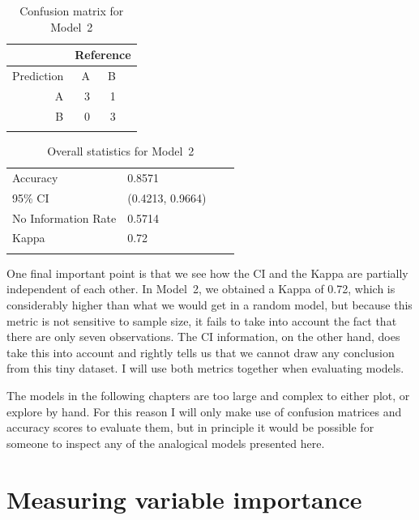\begin{table}%
  \centering
  \begin{tabular}{rrrr}
    \lsptoprule
               & \multicolumn{3}{c}{Reference} \\
    \midrule
    Prediction & A  & B                        \\
    A          & 3  & 1                        \\
    B          & 0  & 3                        \\
    \lspbottomrule
  \end{tabular}
  \caption{Confusion matrix for Model~2}\label{tab:model2-conf}
\end{table}

\begin{table}%
  \centering
  \begin{tabular}{llrr}
    \lsptoprule
    \multicolumn{2}{c}{Overall statistics:} \\

    \midrule
    Accuracy            & 0.8571            \\
    95\% CI             & (0.4213, 0.9664)  \\
    No Information Rate & 0.5714            \\
    Kappa               & 0.72              \\
    \lspbottomrule
  \end{tabular}
  \caption{Overall statistics for Model~2}\label{tab:stats-model2}
\end{table}

\newpage 
One final important point is that we see how the CI and the Kappa are partially independent of each other. In Model~2, we obtained a Kappa of 0.72, which is considerably higher than what we would get in a random model, but because this metric is not sensitive to sample size, it fails to take into account the fact that there are only seven observations. The CI information, on the other hand, does take this into account and rightly tells us that we cannot draw any conclusion from this tiny dataset. I will use both metrics together when evaluating models.

The models in the following chapters are too large and complex to either plot, or explore by hand. For this reason I will only make use of confusion matrices and accuracy scores to evaluate them, but in principle it would be possible for someone to inspect any of the analogical models presented here.

\section{Measuring variable importance}

